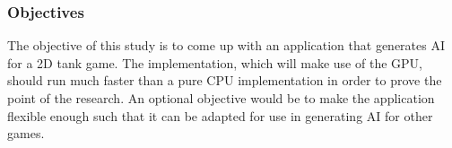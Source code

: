\subsubsection*{Objectives}
The objective of this study is to come up with an application that generates AI for
a 2D tank game. The implementation, which will make use of the GPU, should run
much faster than a pure CPU implementation in order to prove the point of the research.
An optional objective would be to make the application flexible enough such that it
can be adapted for use in generating AI for other games.